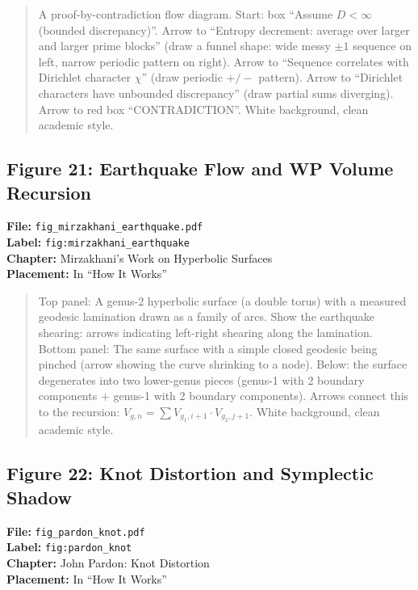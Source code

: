 \begin{quote}
A proof-by-contradiction flow diagram. Start: box ``Assume $D < \infty$ (bounded discrepancy)''. Arrow to ``Entropy decrement: average over larger and larger prime blocks'' (draw a funnel shape: wide messy $\pm 1$ sequence on left, narrow periodic pattern on right). Arrow to ``Sequence correlates with Dirichlet character $\chi$'' (draw periodic $+/-$ pattern). Arrow to ``Dirichlet characters have unbounded discrepancy'' (draw partial sums diverging). Arrow to red box ``CONTRADICTION''. White background, clean academic style.
\end{quote}

\subsection*{Figure 21: Earthquake Flow and WP Volume Recursion}
\textbf{File:} \texttt{fig\_mirzakhani\_earthquake.pdf} \\
\textbf{Label:} \texttt{fig:mirzakhani\_earthquake} \\
\textbf{Chapter:} Mirzakhani's Work on Hyperbolic Surfaces \\
\textbf{Placement:} In ``How It Works''

\begin{quote}
Top panel: A genus-2 hyperbolic surface (a double torus) with a measured geodesic lamination drawn as a family of arcs. Show the earthquake shearing: arrows indicating left-right shearing along the lamination. Bottom panel: The same surface with a simple closed geodesic being pinched (arrow showing the curve shrinking to a node). Below: the surface degenerates into two lower-genus pieces (genus-1 with 2 boundary components $+$ genus-1 with 2 boundary components). Arrows connect this to the recursion: $V_{g,n} = \sum V_{g_1,i+1} \cdot V_{g_2,j+1}$. White background, clean academic style.
\end{quote}

\subsection*{Figure 22: Knot Distortion and Symplectic Shadow}
\textbf{File:} \texttt{fig\_pardon\_knot.pdf} \\
\textbf{Label:} \texttt{fig:pardon\_knot} \\
\textbf{Chapter:} John Pardon: Knot Distortion \\
\textbf{Placement:} In ``How It Works''

